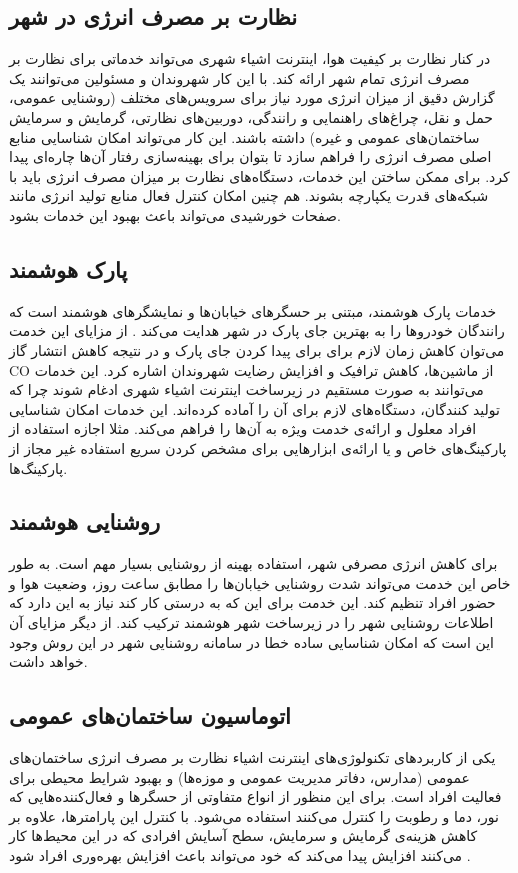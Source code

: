     \subsection{نظارت بر مصرف انرژی در شهر}
      در کنار نظارت بر کیفیت هوا، اینترنت اشیاء شهری می‌تواند خدماتی برای نظارت بر مصرف انرژی تمام شهر ارائه کند.
      با این کار شهروندان و مسئولین می‌توانند یک گزارش دقیق از میزان انرژی مورد نیاز برای سرویس‌های مختلف (روشنایی عمومی، حمل و نقل، چراغ‌های راهنمایی و رانندگی، دوربین‌های نظارتی، گرمایش و سرمایش ساختمان‌های عمومی و غیره) داشته باشند.
      این کار می‌تواند امکان شناسایی منابع اصلی مصرف انرژی را فراهم سازد تا بتوان برای بهینه‌سازی رفتار آن‌ها چاره‌ای پیدا کرد.
      برای ممکن ساختن این خدمات، دستگاه‌های نظارت بر میزان مصرف انرژی باید با شبکه‌های قدرت یکپارچه بشوند.
      هم چنین امکان کنترل فعال منابع تولید انرژی مانند صفحات خورشیدی می‌تواند باعث بهبود این خدمات بشود.

    \subsection{پارک هوشمند}
      خدمات پارک هوشمند، مبتنی بر حسگر‌های خیابان‌ها و نمایشگر‌های هوشمند است که رانندگان خودرو‌ها را به بهترین جای پارک در شهر هدایت می‌کند \cite{lee2008intelligent}.
      از مزایای این خدمت می‌توان کاهش زمان لازم برای برای پیدا کردن جای پارک و در نتیجه کاهش انتشار گاز CO از ماشین‌ها، کاهش ترافیک و افزایش رضایت شهروندان اشاره کرد.
      این خدمات می‌توانند به صورت مستقیم در زیرساخت اینترنت اشیاء شهری ادغام شوند چرا که تولید کنندگان، دستگاه‌های لازم برای آن را آماده کرده‌اند.
      این خدمات امکان شناسایی افراد معلول و ارائه‌ی خدمت ویژه به آن‌ها را فراهم می‌کند.
      مثلا اجازه استفاده از پارکینگ‌های خاص و یا ارائه‌ی ابزار‌هایی برای مشخص کردن سریع استفاده غیر مجاز از پارکینگ‌ها.

    \subsection{روشنایی هوشمند}
      برای کاهش انرژی مصرفی شهر، استفاده بهینه از روشنایی بسیار مهم است.
      به طور خاص این خدمت می‌تواند شدت روشنایی خیابان‌ها را مطابق ساعت روز، وضعیت هوا و حضور افراد تنظیم کند.
      این خدمت برای این که به درستی کار کند نیاز به این دارد که اطلاعات روشنایی شهر را در زیرساخت شهر هوشمند ترکیب کند.
      از دیگر مزایای آن این است که امکان شناسایی ساده خطا در سامانه روشنایی شهر در این روش وجود خواهد داشت.

    \subsection{اتوماسیون ساختمان‌های عمومی}
      یکی از کاربرد‌های تکنولوژی‌های اینترنت اشیاء نظارت بر مصرف انرژی ساختمان‌های عمومی (مدارس، دفاتر مدیریت عمومی و موزه‌ها) و بهبود شرایط محیطی برای فعالیت افراد است.
      برای این منظور از انواع متفاوتی از حسگر‌ها و فعال‌کننده‌هایی که نور، دما و رطوبت را کنترل می‌کنند استفاده می‌شود.
      با کنترل این پارامتر‌ها، علاوه بر کاهش هزینه‌ی گرمایش و سرمایش، سطح آسایش افرادی که در این محیط‌ها کار می‌کنند افزایش پیدا می‌کند که خود می‌تواند باعث افزایش بهره‌وری افراد شود \cite{lee2008intelligent}.

